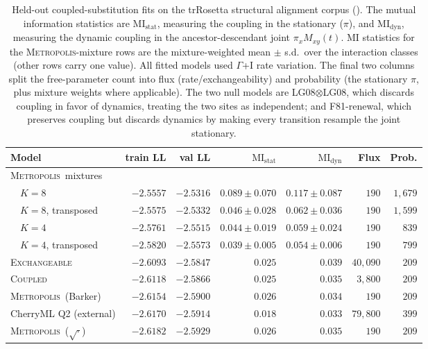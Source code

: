\documentclass{article}
\newcommand{\Coupledm}{\textsc{Coupled}}
\newcommand{\Exchm}{\textsc{Exchangeable}}
\newcommand{\Metrop}{\textsc{Metropolis}}
\begin{document}
\begin{table}[t]
\caption{Held-out coupled-substitution fits on the
trRosetta structural alignment corpus ().
The mutual information statistics are $\mathrm{MI_{stat}}$, measuring the coupling in the stationary ($\pi$),
and $\mathrm{MI_{dyn}}$, measuring the dynamic coupling in the ancestor-descendant joint $\pi_x M_{xy}(t)$.
MI statistics for the \Metrop-mixture rows are the mixture-weighted mean $\pm$ s.d.\ over the
interaction classes (other rows carry one value). All fitted models used $\Gamma$+I rate variation.
The final two columns split the free-parameter count into flux (rate/exchangeability) and probability (the stationary $\pi$, plus mixture weights where applicable).
The two null models are LG08$\otimes$LG08, which discards coupling in favor of dynamics, treating the two sites as independent;
and F81-renewal, which preserves coupling but discards dynamics by making every transition resample the joint stationary.
}
\label{tab:pairfit}
\centering
\setlength{\tabcolsep}{4pt}
\begin{tabular}{lrrrrrr}
\toprule
Model & train LL & val LL & $\mathrm{MI_{stat}}$ & $\mathrm{MI_{dyn}}$ & Flux & Prob.\\
\midrule
\Metrop\ mixtures & & & & & & \\
$\quad K{=}8$              & $-2.5557$ & $-2.5316$ & $0.089{\pm}0.070$ & $0.117{\pm}0.087$ & $190$ & $1{,}679$\\
$\quad K{=}8$, transposed  & $-2.5575$ & $-2.5332$ & $0.046{\pm}0.028$ & $0.062{\pm}0.036$ & $190$ & $1{,}599$\\
$\quad K{=}4$              & $-2.5761$ & $-2.5515$ & $0.044{\pm}0.019$ & $0.059{\pm}0.024$ & $190$ & $839$\\
$\quad K{=}4$, transposed  & $-2.5820$ & $-2.5573$ & $0.039{\pm}0.005$ & $0.054{\pm}0.006$ & $190$ & $799$\\
\midrule
\Exchm                        & $-2.6093$ & $-2.5847$ & $0.025$ & $0.039$ & $40{,}090$ & $209$\\
\Coupledm                     & $-2.6118$ & $-2.5866$ & $0.025$ & $0.035$ & $3{,}800$ & $209$\\
\Metrop\ (Barker)             & $-2.6154$ & $-2.5900$ & $0.026$ & $0.034$ & $190$ & $209$\\
CherryML Q2 (external)        & $-2.6170$ & $-2.5914$ & $0.018$ & $0.033$ & $79{,}800$ & $399$\\
\Metrop\ ($\sqrt{\cdot}$)     & $-2.6182$ & $-2.5929$ & $0.026$ & $0.035$ & $190$ & $209$\\

\end{tabular}
\end{table}
\end{document}
